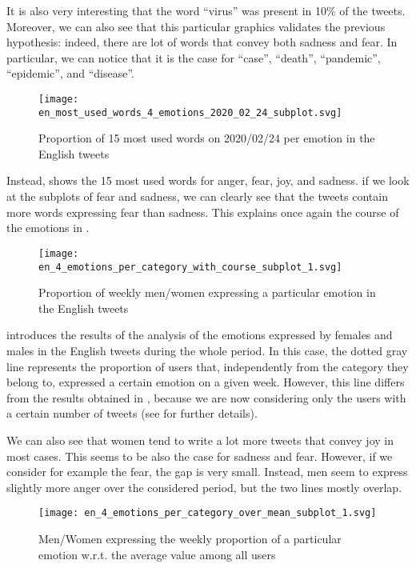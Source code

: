 It is also very interesting that the word “virus” was present in 10\% of the tweets. Moreover, we can also see that this particular graphics validates the previous hypothesis: indeed, there are lot of words that convey both sadness and fear. In particular, we can notice that it is the case for “case”, “death”, “pandemic”, “epidemic”, and “disease”.

\begin{figure}[H]
	\centering
    	\texttt{[image: en\_most\_used\_words\_4\_emotions\_2020\_02\_24\_subplot.svg]}
    	\caption{Proportion of 15 most used words on 2020/02/24 per emotion in the English tweets}
    	\label{fig:en-most-used-word-subplot-2020-02-24}
\end{figure}

Instead,  shows the 15 most used words for anger, fear, joy, and sadness. if we look at the subplots of fear and sadness, we can clearly see that the tweets contain more words expressing fear than sadness. This explains once again the course of the emotions in .

\begin{figure}[H]
	\centering
    	\texttt{[image: en\_4\_emotions\_per\_category\_with\_course\_subplot\_1.svg]}
    	\caption{Proportion of weekly men/women expressing a particular emotion in the English tweets}
    	\label{fig:en-4-emotions-per-category-course-subplot-1}
\end{figure}

 introduces the results of the analysis of the emotions expressed by females and males in the English tweets during the whole period. In this case, the dotted gray line represents the proportion of users that, independently from the category they belong to, expressed a certain emotion on a given week. However, this line differs from the results obtained in , because we are now considering only the users with a certain number of tweets (see  for further details).

We can also see that women tend to write a lot more tweets that convey joy in most cases. This seems to be also the case for sadness and fear. However, if we consider for example the fear, the gap is very small. Instead, men seem to express slightly more anger over the considered period, but the two lines mostly overlap.

\begin{figure}[H]
	\centering
    	\texttt{[image: en\_4\_emotions\_per\_category\_over\_mean\_subplot\_1.svg]}
    	\caption{Men/Women expressing the weekly proportion of a particular emotion w.r.t. the average value among all users}
    	\label{fig:en-4-emotions-per-category-course-mean-1}
\end{figure}

